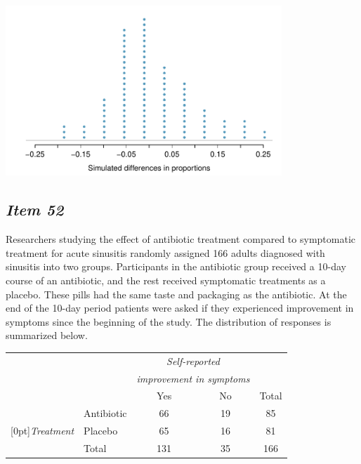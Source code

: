 \begin{center}


\includegraphics[width = 0.78\textwidth]{includes/heartTr_RandHist} \\


\end{center}





\subsection{\textbf{\textit{Item 52}}}








Researchers studying the effect of antibiotic treatment compared to symptomatic treatment for acute sinusitis randomly assigned 166 adults diagnosed with sinusitis into two groups. Participants in the antibiotic group received a 10-day course of an antibiotic, and the rest received symptomatic treatments as a placebo. These pills had the same taste and packaging as the antibiotic. At the end of the 10-day period patients were asked if they experienced improvement in symptoms since the beginning of the study. The distribution of responses is summarized below. 


\begin{center}


\begin{tabular}{ll cc c} 


& & \multicolumn{2}{c}{\textit{Self-reported}} \\


& & \multicolumn{2}{c}{\textit{improvement in symptoms}} \\


\cline{3-4}


& & Yes & No & Total \\


\cline{2-5}


&Antibiotic & 66 & 19 & 85 \\


\raisebox{1.5ex}[0pt]{\textit{Treatment}} & Placebo & 65 & 16 & 81 \\


\cline{2-5}


&Total & 131 & 35 & 166


\end{tabular}


\end{center}


